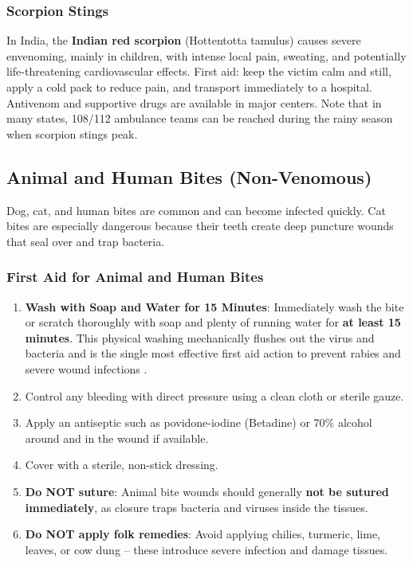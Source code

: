 \subsubsection{Scorpion Stings}

In India, the \textbf{Indian red scorpion} (Hottentotta tamulus) causes severe envenoming, mainly in children, with intense local pain, sweating, and potentially life-threatening cardiovascular effects. First aid: keep the victim calm and still, apply a cold pack to reduce pain, and transport immediately to a hospital. Antivenom and supportive drugs are available in major centers. Note that in many states, 108/112 ambulance teams can be reached during the rainy season when scorpion stings peak.

\subsection{Animal and Human Bites (Non-Venomous)}

Dog, cat, and human bites are common and can become infected quickly. Cat bites are especially dangerous because their teeth create deep puncture wounds that seal over and trap bacteria.

\subsubsection{First Aid for Animal and Human Bites}

\begin{enumerate}[leftmargin=*]
\item \textbf{Wash with Soap and Water for 15 Minutes}: Immediately wash the bite or scratch thoroughly with soap and plenty of running water for \textbf{at least 15 minutes}. This physical washing mechanically flushes out the virus and bacteria and is the single most effective first aid action to prevent rabies and severe wound infections \cite{who_2018}.
\item Control any bleeding with direct pressure using a clean cloth or sterile gauze.
\item Apply an antiseptic such as povidone-iodine (Betadine) or 70\% alcohol around and in the wound if available.
\item Cover with a sterile, non-stick dressing.
\item \textbf{Do NOT suture}: Animal bite wounds should generally \textbf{not be sutured immediately}, as closure traps bacteria and viruses inside the tissues.
\item \textbf{Do NOT apply folk remedies}: Avoid applying chilies, turmeric, lime, leaves, or cow dung -- these introduce severe infection and damage tissues.
\end{enumerate}

